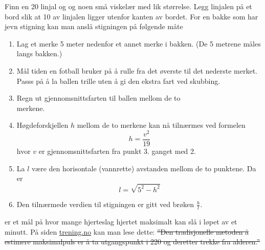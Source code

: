 Finn en 20 linjal og og noen små viskelær med lik størrelse. Legg linjalen på et bord slik at 10 av linjalen ligger utenfor kanten av bordet.
\newpage
{}
For en bakke som har jevn stigning kan man anslå stigningen på følgende måte
\begin{enumerate}
	\item Lag et merke 5 meter nedenfor et annet merke i bakken. (De 5 metrene måles langs bakken.)
	\item Mål tiden en fotball bruker på å rulle fra det øverste til det nederste merket. Passs på å la ballen trille uten å gi den ekstra fart ved skubbing.
	\item Regn ut gjennomsnittsfarten til ballen mellom de to \\merkene.
	\item Høgdeforskjellen $ h $ mellom de to merkene kan nå tilnærmes ved formelen
	\[ h= \frac{v^2}{19}\]
	hvor $ v $ er gjennomsnittsfarten fra punkt 3. ganget med 2.
	\item La $ l $ være den horisontale  (vannrette) avstanden mellom de to punktene. Da er
	\[ l=\sqrt{5^2-h^2} \]
	\item Den tilnærmede verdien til stigningen er gitt ved brøken $ \frac{h}{l} $.
\end{enumerate}

\newpage
{}
 er et mål på hvor mange hjerteslag hjertet maksimalt kan slå i løpet av et minutt. På siden \href{http://www.trening.no/utholdenhet/ny-formel-for-beregning-av-makspuls/}{\color{blue}trening.no} kan man lese dette:\os
\st{''Den tradisjonelle metoden å estimere maksimalpuls er å ta utgangspunkt i 220 og deretter trekke fra alderen.''}

